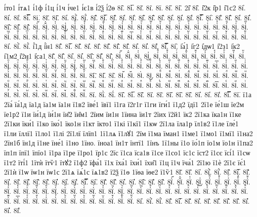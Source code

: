 {і́то1
і́тѧ1
і́1ф
і́1ц
і́1ч
і́че1
і́є1в
і́2ѯ
і́2ѳ
8і̂.
8і̅.
8і̆.
8і̇.
8ї.
8і̋.
8і̏.
2і̑
8і̑.
і̑2к
і̑р1
і̑1с2
8і̓.
8і̔.
8і̾.
8і̿.
8і͘.
8і҃.
8і҄.
8і҅.
8і҅̀.
8і҅́.
8і҅̂.
8і҅̅.
8і҅̆.
8і҅̇.
8і҅̈.
8і҅̋.
8і҅̏.
8і҅̑.
8і҅̓.
8і҅̔.
8і҅̾.
8і҅̿.
8і҅͘.
8і҅҃.
8і҅҄.
8і҅҅.
8і҅҆.
8і҅҇.
8і҅᷀.
8і҅᷁.
8і҅᷶.
8і᷷҅.
8і᷸҅.
8і᷹҅.
8і҅ⷠ.
8і҅ⷡ.
8і҅ⷢ.
8і҅ⷣ.
8і҅ⷤ.
8і҅ⷥ.
8і҅ⷦ.
8і҅ⷧ.
8і҅ⷨ.
8і҅ⷩ.
8і҅ⷪ.
8і҅ⷫ.
8і҅ⷬ.
8і҅ⷭ.
8і҅ⷮ.
8і҅ⷯ.
8і҅ⷰ.
8і҅ⷱ.
8і҅ⷲ.
8і҅ⷳ.
8і҅ⷴ.
8і҅ⷵ.
8і҅ⷶ.
8і҅ⷷ.
8і҅ⷸ.
8і҅ⷹ.
8і҅ⷺ.
8і҅ⷻ.
8і҅ⷼ.
8і҅ⷽ.
8і҅ⷾ.
8і҅ⷿ.
8і҅꙯.
8і҅ꙴ.
8і҅ꙵ.
8і҅ꙶ.
8і҅ꙷ.
8і҅ꙸ.
8і҅ꙹ.
8і҅ꙺ.
8і҅ꙻ.
8і҅꙼.
8і҅꙽.
8і҅ꚞ.
8і҅ꚟ.
8і҆.
8і҆̀.
8і҆́.
і҆́1д
і҆́н1
8і҆̂.
8і҆̅.
8і҆̆.
8і҆̇.
8і҆̈.
8і҆̋.
8і҆̏.
8і҆̑.
8і҆̓.
8і҆̔.
8і҆̾.
8і҆̿.
8і҆͘.
і҆а́1
і҆г2
і҆дѡ1
і҆2з1
і҆к2
і҆1м2
і҆2н1
і҆са1
8і҆҃.
8і҆҄.
8і҆҅.
8і҆҆.
8і҆҇.
8і҆᷀.
8і҆᷁.
8і҆᷶.
8і᷷҆.
8і᷸҆.
8і᷹҆.
8і҆ⷠ.
8і҆ⷡ.
8і҆ⷢ.
8і҆ⷣ.
8і҆ⷤ.
8і҆ⷥ.
8і҆ⷦ.
8і҆ⷧ.
8і҆ⷨ.
8і҆ⷩ.
8і҆ⷪ.
8і҆ⷫ.
8і҆ⷬ.
8і҆ⷭ.
8і҆ⷮ.
8і҆ⷯ.
8і҆ⷰ.
8і҆ⷱ.
8і҆ⷲ.
8і҆ⷳ.
8і҆ⷴ.
8і҆ⷵ.
8і҆ⷶ.
8і҆ⷷ.
8і҆ⷸ.
8і҆ⷹ.
8і҆ⷺ.
8і҆ⷻ.
8і҆ⷼ.
8і҆ⷽ.
8і҆ⷾ.
8і҆ⷿ.
8і҆꙯.
8і҆ꙴ.
8і҆ꙵ.
8і҆ꙶ.
8і҆ꙷ.
8і҆ꙸ.
8і҆ꙹ.
8і҆ꙺ.
8і҆ꙻ.
8і҆꙼.
8і҆꙽.
8і҆ꚞ.
8і҆ꚟ.
8і҇.
8і᷀.
8і᷁.
8і᷶.
8і᷷.
8і᷸.
8і᷹.
8іⷠ.
8іⷡ.
8іⷢ.
8іⷣ.
8іⷤ.
8іⷥ.
8іⷦ.
8іⷧ.
8іⷨ.
8іⷩ.
8іⷪ.
8іⷫ.
8іⷬ.
8іⷭ.
8іⷮ.
8іⷯ.
8іⷰ.
8іⷱ.
8іⷲ.
8іⷳ.
8іⷴ.
8іⷵ.
8іⷶ.
8іⷷ.
8іⷸ.
8іⷹ.
8іⷺ.
8іⷻ.
8іⷼ.
8іⷽ.
8іⷾ.
8іⷿ.
8і꙯.
8іꙴ.
8іꙵ.
8іꙶ.
8іꙷ.
8іꙸ.
8іꙹ.
8іꙺ.
8іꙻ.
8і꙼.
8і꙽.
8іꚞ.
8іꚟ.
8ї.
8ї̀.
8ї́.
8ї̂.
8ї̅.
8ї̆.
8ї̇.
8ї̈.
8ї̋.
8ї̏.
8ї̑.
8ї̓.
8ї̔.
8ї̾.
8ї̿.
8ї͘.
ї1а
2їа́
їа́1д
їа1д
їа1м
їа1н
ї1в2
їве́1
ївї1
ї1га
ї2г1г
ї1ги
їги́1
ї1д2
їдї1
2ї1е
їе́1ш
їе2м
їе1р2
ї1и
їи́1д
їи́1н
їи̑2
їи̑м1
2їим
їи1н
1їина
їи1т
2їих
ї2й1
їк2
2ї1ка
їка1н
ї1ке
2ї1ки
їки́1
ї1ко
їко́1
їко1н
ї1кт
їкто1
ї1кі
ї1кї1
ї1кѡ
2ї1ла
їла1р
їл1в2
ї1ле
їле́1
ї1ли
їллї1
ї1ло1
ї1лі
2ї1лї
їлїп1
1ї1лѧ
ї1лꙋ1
2їм
ї1ма
їман1
ї1ме1
ї1мо1
ї1мї1
ї1на2
2їн1б
їн1д
ї1не
їне́1
ї1но
1їно.
їноа1
їн1т
їнтї1
1їнъ
1ї1ны
ї1о
їо́1п
їо1м
їо1н
ї1па2
їп1п
їпї1
їпїо1
ї1ра
ї1ре
ї1ро1
їр1с
2їс
ї1са
їса1в
ї1се
ї1со1
їс1с
їст2
ї1сє
їсі́1
ї1сѡ
ї1т2
їті́1
1їтѝ
їтѷ1
їтꙋ2
ї1ф2
їфа́1
ї1х
їха́1
їхи́1
їхи̑1
ї1ц
ї1ч
їча́1
2ї1ю
ї1ѐ
2ї1є
їє́1
2ї1ѝ
ї1ѡ
їѡ1н
їѡ1с
2ї1ѧ
їѧ́1с
їѧ1в2
ї2ѯ
ї1ѳ
1їѳа
їѳе2
ї1ѷ1
8ї҃.
8ї҄.
8ї҅.
8ї҅̀.
8ї҅́.
8ї҅̂.
8ї҅̅.
8ї҅̆.
8ї҅̇.
8ї҅̈.
8ї҅̋.
8ї҅̏.
8ї҅̑.
8ї҅̓.
8ї҅̔.
8ї҅̾.
8ї҅̿.
8ї҅͘.
8ї҅҃.
8ї҅҄.
8ї҅҅.
8ї҅҆.
8ї҅҇.
8ї҅᷀.
8ї҅᷁.
8ї҅᷶.
8ї᷷҅.
8ї᷸҅.
8ї᷹҅.
8ї҅ⷠ.
8ї҅ⷡ.
8ї҅ⷢ.
8ї҅ⷣ.
8ї҅ⷤ.
8ї҅ⷥ.
8ї҅ⷦ.
8ї҅ⷧ.
8ї҅ⷨ.
8ї҅ⷩ.
8ї҅ⷪ.
8ї҅ⷫ.
8ї҅ⷬ.
8ї҅ⷭ.
8ї҅ⷮ.
8ї҅ⷯ.
8ї҅ⷰ.
8ї҅ⷱ.
8ї҅ⷲ.
8ї҅ⷳ.
8ї҅ⷴ.
8ї҅ⷵ.
8ї҅ⷶ.
8ї҅ⷷ.
8ї҅ⷸ.
8ї҅ⷹ.
8ї҅ⷺ.
8ї҅ⷻ.
8ї҅ⷼ.
8ї҅ⷽ.
8ї҅ⷾ.
8ї҅ⷿ.
8ї҅꙯.
8ї҅ꙴ.
8ї҅ꙵ.
8ї҅ꙶ.
8ї҅ꙷ.
8ї҅ꙸ.
8ї҅ꙹ.
8ї҅ꙺ.
8ї҅ꙻ.
8ї҅꙼.
8ї҅꙽.
8ї҅ꚞ.
8ї҅ꚟ.
8ї҆.
8ї҆̀.
8ї҆́.
8ї҆̂.
8ї҆̅.
8ї҆̆.
8ї҆̇.
8ї҆̈.
8ї҆̋.
8ї҆̏.
8ї҆̑.
8ї҆̓.
8ї҆̔.
8ї҆̾.
}
